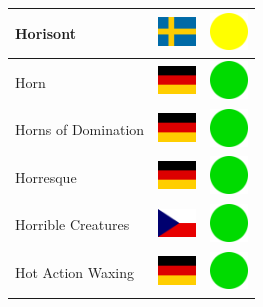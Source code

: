 \documentclass[12pt, a4paper, twoside]{report}
\begin{document}
\begin{center}
\begin{longtable}{|p{5cm}|p{2cm}|p{2cm}|}
 Horisont                                                   & \includegraphics[width=1cm]{../img/flags/se} &   \includegraphics[width=1cm]{../likes/m} \\ \hline
 Horn                                                       & \includegraphics[width=1cm]{../img/flags/de} &   \includegraphics[width=1cm]{../likes/y} \\ \hline
 Horns of Domination                                        & \includegraphics[width=1cm]{../img/flags/de} &   \includegraphics[width=1cm]{../likes/y} \\ \hline
 Horresque                                                  & \includegraphics[width=1cm]{../img/flags/de} &   \includegraphics[width=1cm]{../likes/y} \\ \hline
 Horrible Creatures                                         & \includegraphics[width=1cm]{../img/flags/cz} &   \includegraphics[width=1cm]{../likes/y} \\ \hline
 Hot Action Waxing                                          & \includegraphics[width=1cm]{../img/flags/de} &   \includegraphics[width=1cm]{../likes/y} \\ \hline

\end{longtable}
\end{center}
\end{document}
